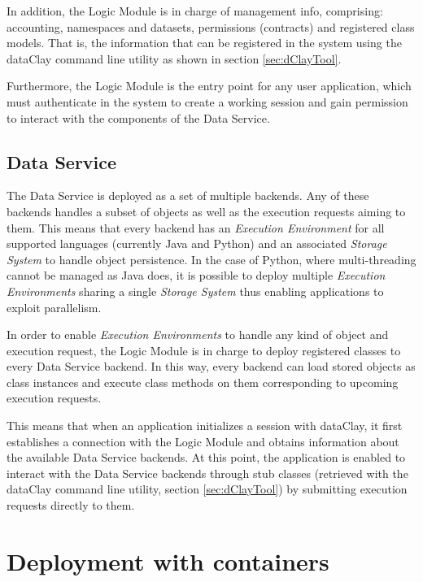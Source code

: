 In addition, the Logic Module is in charge of management info, comprising: accounting, namespaces and datasets, permissions (contracts) and registered class models. That is, the information that can be registered in the system using the dataClay command line utility as shown in section \ref{sec:dClayTool}.

Furthermore, the Logic Module is the entry point for any user application, which must authenticate in the system to create a working session and gain permission to interact with the components of the Data Service.

\subsection{Data Service}
\label{sec:DataService}
The Data Service is deployed as a set of multiple backends. Any of these backends handles a subset of objects as well as the execution requests aiming to them. This means that every backend has an \textit{Execution Environment} for all supported languages (currently Java and Python) and an associated \textit{Storage System} to handle object persistence. In the case of Python, where multi-threading cannot be managed as Java does, it is possible to deploy multiple \textit{Execution Environments} sharing a single \textit{Storage System} thus enabling applications to exploit parallelism.

In order to enable \textit{Execution Environments} to handle any kind of object and execution request, the Logic Module is in charge to deploy registered classes to every Data Service backend. In this way, every backend can load stored objects as class instances and execute class methods on them corresponding to upcoming execution requests.

This means that when an application initializes a session with dataClay, it first establishes a connection with the Logic Module and obtains information about the available Data Service backends. At this point, the application is enabled to interact with the Data Service backends through stub classes (retrieved with the dataClay command line utility, section \ref{sec:dClayTool}) by submitting execution requests directly to them.



\section{Deployment with containers }

